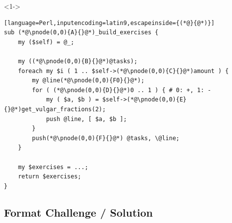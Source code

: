 \documentclass[ngerman,xcolor={table,dvipsnames},smaller,compress,hyperref={bookmarks,colorlinks}]{beamer}
\begin{document}
\begin{frame}[t,fragile]

\begin{block}<1->{}
\scriptsize
\begin{lstlisting}[language=Perl,inputencoding=latin9,escapeinside={(*@}{@*)}]
sub (*@\pnode(0,0){A}{}@*)_build_exercises {
    my ($self) = @_;

    my ((*@\pnode(0,0){B}{}@*)@tasks);
    foreach my $i ( 1 .. $self->(*@\pnode(0,0){C}{}@*)amount ) {
        my @line(*@\pnode(0,0){F0}{}@*);
        for ( (*@\pnode(0,0){D}{}@*)0 .. 1 ) { # 0: +, 1: -
            my ( $a, $b ) = $self->(*@\pnode(0,0){E}{}@*)get_vulgar_fractions(2);
            push @line, [ $a, $b ];
        }
        push(*@\pnode(0,0){F}{}@*) @tasks, \@line;
    }

    my $exercises = ...;
    return $exercises;
}
\end{lstlisting}
\end{block}

\begin{itemize}
\end{itemize}

\end{frame}

\subsection{Format Challenge / Solution}
\end{document}
